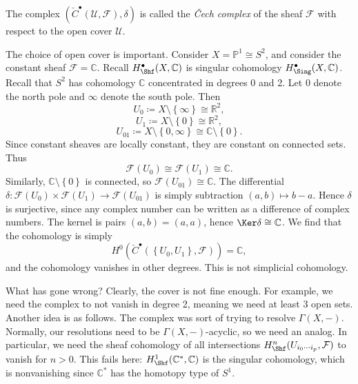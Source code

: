 \begin{definition}\label{4.2.1}
	The complex $(\check{C}^{\bullet} (\mathcal{U} ,\mathcal{F} ),\delta )$ is called the \emph{\v{C}ech complex} of the sheaf $\mathcal{F} $ with respect to the open cover $\mathcal{U} $.
\end{definition}


The choice of open cover is important. Consider $X=\mathbb{P} ^1 \cong S^2$, and consider the constant sheaf $\mathcal{F} =\mathbb{C} $. Recall $H^{\bullet}_{\Shf }(X,\mathbb{C} )$ is singular cohomology $H^{\bullet}_{\Sing } (X,\mathbb{C} )$. Recall that $S^2$ has cohomology $\mathbb{C} $ concentrated in degrees 0 and 2.
Let $0$ denote the north pole and $\infty $ denote the south pole. Then
\[
	U_0 \coloneqq X\setminus \left\{ \infty  \right\} \cong \mathbb{R} ^2,
\]
\[
	U_1 \coloneqq X \setminus \left\{ 0 \right\} \cong \mathbb{R} ^2,
\]
\[
	U_{01} \coloneqq X\setminus \left\{ 0,\infty  \right\} \cong \mathbb{C} \setminus \left\{ 0 \right\} 
.\]
Since constant sheaves are locally constant, they are constant on connected sets. Thus
\[
	\mathcal{F} (U_0) \cong  \mathcal{F} (U_1) \cong \mathbb{C} 
.\]
Similarly, $\mathbb{C} \setminus \left\{ 0 \right\} $ is connected, so $\mathcal{F} (U_{01} )\cong \mathbb{C} $. The differential $\delta : \mathcal{F} (U_0)\times \mathcal{F} (U_1)\to \mathcal{F} (U_{01} )$ is simply subtraction $(a,b)\mapsto b-a$. Hence $\delta $ is surjective, since any complex number can be written as a difference of complex numbers. The kernel is pairs $(a,b)=(a,a)$, hence $\Ker \delta \cong \mathbb{C} $. We find that the cohomology is simply
\[
	H^0(\check{C}^{\bullet} (\left\{ U_0,U_1 \right\} ,\mathcal{F} )) = \mathbb{C} ,
\]
and the cohomology vanishes in other degrees. This is not simplicial cohomology.

What has gone wrong? Clearly, the cover is not fine enough. For example, we need the complex to not vanish in degree 2, meaning we need at least 3 open sets. Another idea is as follows. The complex was sort of trying to resolve $\Gamma (X,-)$. Normally, our resolutions need to be $\Gamma (X,-)$-acyclic, so we need an analog. In particular, we need the sheaf cohomology of all intersections $H^n_{\Shf }(U_{i_0 \cdots i_p} ,\mathcal{F} )$ to vanish for $n>0$. This fails here: $H^1_{\Shf }(\mathbb{C} ^*,\mathbb{C} )$ is the singular cohomology, which is nonvanishing since $\mathbb{C} ^*$ has the homotopy type of $S^1$.

